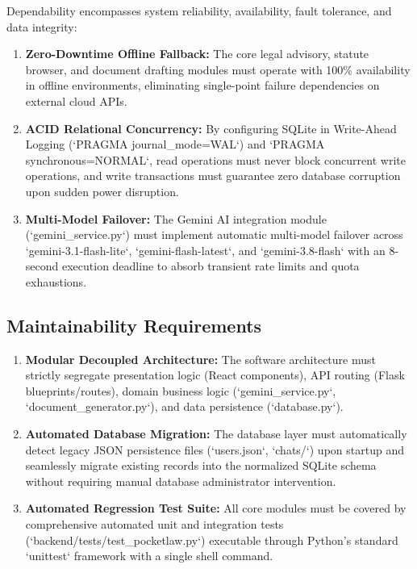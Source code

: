 Dependability encompasses system reliability, availability, fault tolerance, and data integrity:
\begin{enumerate}
    \item \textbf{Zero-Downtime Offline Fallback:} The core legal advisory, statute browser, and document drafting modules must operate with 100\% availability in offline environments, eliminating single-point failure dependencies on external cloud APIs.
    \item \textbf{ACID Relational Concurrency:} By configuring SQLite in Write-Ahead Logging (`PRAGMA journal_mode=WAL`) and `PRAGMA synchronous=NORMAL`, read operations must never block concurrent write operations, and write transactions must guarantee zero database corruption upon sudden power disruption.
    \item \textbf{Multi-Model Failover:} The Gemini AI integration module (`gemini_service.py`) must implement automatic multi-model failover across `gemini-3.1-flash-lite`, `gemini-flash-latest`, and `gemini-3.8-flash` with an 8-second execution deadline to absorb transient rate limits and quota exhaustions.
\end{enumerate}

\subsection{Maintainability Requirements}
\label{subsec:maintainability_requirements}

\begin{enumerate}
    \item \textbf{Modular Decoupled Architecture:} The software architecture must strictly segregate presentation logic (React components), API routing (Flask blueprints/routes), domain business logic (`gemini_service.py`, `document_generator.py`), and data persistence (`database.py`).
    \item \textbf{Automated Database Migration:} The database layer must automatically detect legacy JSON persistence files (`users.json`, `chats/`) upon startup and seamlessly migrate existing records into the normalized SQLite schema without requiring manual database administrator intervention.
    \item \textbf{Automated Regression Test Suite:} All core modules must be covered by comprehensive automated unit and integration tests (`backend/tests/test_pocketlaw.py`) executable through Python's standard `unittest` framework with a single shell command.
\end{enumerate}

